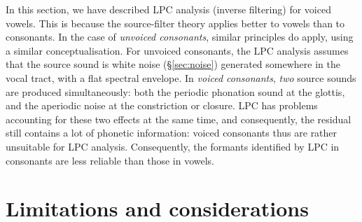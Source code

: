 \documentclass[
]{book}
\begin{document}
In this section, we have described LPC analysis (inverse filtering) for voiced vowels. This is because the source-filter theory applies better to vowels than to consonants. In the case of \emph{unvoiced consonants}, similar principles do apply, using a similar conceptualisation. For unvoiced consonants, the LPC analysis assumes that the source sound is white noise (§\ref{sec:noise}) generated somewhere in the vocal tract, with a flat spectral envelope. In \emph{voiced consonants}, \emph{two} source sounds are produced simultaneously: both the periodic phonation sound at the glottis, and the aperiodic noise at the constriction or closure. LPC has problems accounting for these two effects at the same time, and consequently, the residual still contains a lot of phonetic information: voiced consonants thus are rather unsuitable for LPC analysis. Consequently, the formants identified by LPC in consonants are less reliable than those in vowels.

\section{Limitations and considerations}\label{sec:LPC-details}
\end{document}
